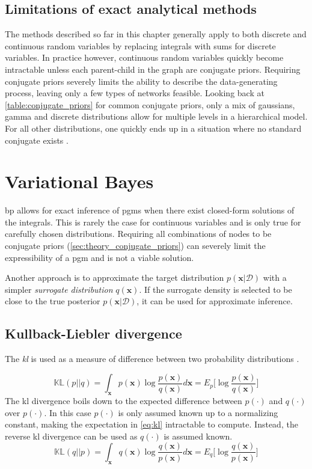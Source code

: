 \subsection{Limitations of exact analytical methods}
The methods described so far in this chapter generally apply to both discrete and continuous random variables by replacing integrals with sums for discrete variables. In practice however, continuous random variables quickly become intractable unless each parent-child in the graph are conjugate priors. Requiring conjugate priors severely limits the ability to describe the data-generating process, leaving only a few types of networks feasible. Looking back at \cref{table:conjugate_priors} for common conjugate priors, only a mix of gaussians, gamma and discrete distributions allow for multiple levels in a hierarchical model. For all other distributions, one quickly ends up in a situation where no standard conjugate exists \cite{winnbishop}. 
\section{Variational Bayes}
\acrshort{bp} allows for exact inference of \acrshort{pgm}s when there exist closed-form solutions of the integrals. This is rarely the case for continuous variables and is only true for carefully chosen distributions. Requiring all combinations of nodes to be conjugate priors (\cref{sec:theory_conjugate_priors}) can severely limit the expressibility of a \acrshort{pgm} and is not a viable solution. 

Another approach is to approximate the target distribution $p(\mathbf{x} | \mathcal{D})$ with a simpler \textit{surrogate distribution} $q(\mathbf{x})$. If the surrogate density is selected to be close to the true posterior $p(\mathbf{x} | \mathcal{D})$, it can be used for approximate inference. 

\subsection{Kullback-Liebler divergence}\todo
The \textit{\acrfull{kl}}  is used as a measure of difference between two probability distributions \cite{kullback1951,murphy}.

\begin{equation}\label{eq:kl}
    \mathbb{KL}(p || q) = \int_\mathbf{x} p(\mathbf{x}) \log \frac{p(\mathbf{x})}{q(\mathbf{x})} d\mathbf{x} = E_{p} \big[ \log \frac{p(\mathbf{x})}{q(\mathbf{x})} \big]
\end{equation}
The \acrshort{kl} divergence boils down to the expected difference between $p(\cdot)$ and $q(\cdot)$ over $p(\cdot)$.
In this case $p(\cdot)$ is only assumed known up to a normalizing constant, making the expectation in \cref{eq:kl} intractable to compute. Instead, the reverse \acrshort{kl} divergence can be used as $q(\cdot)$ is assumed known.
\begin{equation}\label{eq:reverse_kl}
    \mathbb{KL}(q || p) = \int_\mathbf{x} q(\mathbf{x}) \log \frac{q(\mathbf{x})}{p(\mathbf{x})} d\mathbf{x} = E_{q} \big[ \log \frac{q(\mathbf{x})}{p(\mathbf{x})} \big]
\end{equation}

